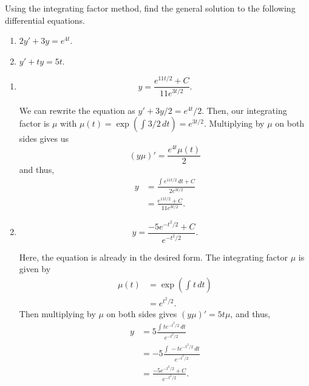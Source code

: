 \documentclass[12 pt, letterpaper]{hmcpset}
\begin{document}
\pagebreak

\begin{problem}[4:]
	Using the integrating factor method, find the general solution to the following differential equations.
	\begin{enumerate}
		\item $2y' + 3y = e^{4t}$.
		\item $y' + ty = 5t$.
	\end{enumerate}
\end{problem}

\begin{solution}
	\begin{enumerate}
		\item
			\[
				\boxed{
					y = \frac{e^{11 t/2} + C}{11 e^{3 t/2}}.
				}
			\]

			We can rewrite the equation as $y' + 3y/2 = e^{4t}/2$. Then, our integrating factor is $\mu$ with $\mu(t) = \exp(\int_{} 3/2 \, dt ) = e^{3t/2}$. Multiplying by $\mu$ on both sides gives us
			\[
				(y \mu)' = \frac{e^{4t} \mu(t)}{2}
			\]
			and thus,
			\[
				\begin{split}
					y & = \frac{\int_{} e^{11 t/2} \, dt + C}{2 e^{3 t/2}} \\
					  & = \frac{e^{11 t/2} + C}{11 e^{3 t/2}}.
				\end{split}
			\]
		\item
			\[
				\boxed{
					y = \frac{-5 e^{- t^{2}/2} + C}{e^{- t^{2}/2}}.
				}
			\]

			Here, the equation is already in the desired form. The integrating factor $\mu$ is given by
			\[
				\begin{split}
					\mu(t) & = \exp \left ( \int_{} t \, dt  \right ) \\
					       & = e^{t^{2}/2}.		
				\end{split}
			\]
			Then multiplying by $\mu$ on both sides gives $(y \mu)' = 5 t \mu$, and thus,
			\[
				\begin{split}
					y & = 5 \frac{\int_{} t e^{- t^{2}/2} \, dt}{e^{- t^{2}/2}} \\
					  & = -5 \frac{\int_{} - t e^{- t^{2}/2} \, dt }{e^{- t^{2}/2}} \\
					  & = \frac{-5 e^{- t^{2}/2} + C}{e^{- t^{2}/2}}.
				\end{split}
			\]
	\end{enumerate}
\end{solution}

\pagebreak
\end{document}
